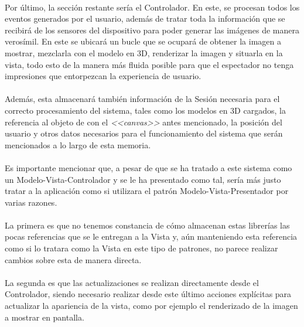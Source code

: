 \documentclass{subfiles}
\begin{document}
        \paragraph{}
        Por último, la sección restante sería el Controlador. En este, se procesan todos los eventos generados por el usuario, además de tratar toda la información que se recibirá de los sensores del dispositivo para poder generar las imágenes de manera verosímil. En este se ubicará un bucle que se ocupará de obtener la imagen a mostrar, mezclarla con el modelo en 3D, renderizar la imagen y situarla en la vista, todo esto de la manera más fluida posible para que el espectador no tenga impresiones que entorpezcan la experiencia de usuario.

        \paragraph{}
        Además, esta almacenará también información de la Sesión necesaria para el correcto procesamiento del sistema, tales como los modelos en 3D cargados, la referencia al objeto de \js con el \textit{<<canvas>>} antes mencionado, la posición del usuario y otros datos necesarios para el funcionamiento del sistema que serán mencionados a lo largo de esta memoria.

        \paragraph{}
        Es importante mencionar que, a pesar de que se ha tratado a este sistema como un Modelo-Vista-Controlador y se le ha presentado como tal, sería más justo tratar a la aplicación como si utilizara el patrón Modelo-Vista-Presentador \cite{web:mvp} por varias razones.

        \paragraph{}
        La primera es que no tenemos constancia de cómo almacenan estas librerías las pocas referencias que se le entregan a la Vista y, aún manteniendo esta referencia como si lo tratara como la Vista en este tipo de patrones, no parece realizar cambios sobre esta de manera directa.

        \paragraph{}
        La segunda es que las actualizaciones se realizan directamente desde el Controlador, siendo necesario realizar desde este último acciones explícitas para actualizar la apariencia de la vista, como por ejemplo el renderizado de la imagen a mostrar en pantalla.
\end{document}
